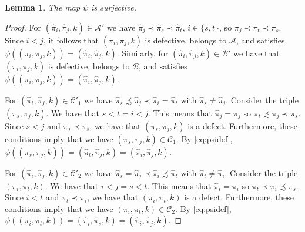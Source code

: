 \documentclass[12pt]{amsart}
\newtheorem{lem}[thm]{Lemma}
\theoremstyle{definition}
\numberwithin{equation}{section}
\newcommand{\A}{\mathcal{A}}
\newcommand{\B}{\mathcal{B}}
\newcommand{\C}{\mathcal{C}}
\newcommand{\D}{\mathcal{D}}
\begin{document}
\begin{lem}\label{l: surjective}
    The map $\psi$ is surjective.  
\end{lem}

\begin{proof}
For $(\hat\pi_i, \hat\pi_j, k) \in \A'$
we have $\hat \pi_j \prec \hat \pi_s \prec \hat \pi_t$, $i \in \{s, t\}$, so $\pi_j \prec \pi_t \prec \pi_s$. Since $i<j$, it follows that $(\pi_i, \pi_j, k)$ is defective, belongs to $\A$, and satisfies
$\psi((\pi_i, \pi_j, k)) = (\hat\pi_i, \hat\pi_j, k)$. 
Similarly, for 
$(\hat\pi_i, \hat\pi_j, k) \in \B'$
we have that
$(\pi_i, \pi_j, k)$ is defective, belongs to $\B$, and  satisfies
$\psi((\pi_i, \pi_j, k)) = (\hat\pi_i, \hat\pi_j, k)$.


For $(\hat\pi_i, \hat\pi_j, k) \in \C'_1$ we have
$\hat \pi_s \precsim \hat \pi_j \prec \hat \pi_i = \hat \pi_t$ with $\hat \pi_s \neq \hat \pi_j$.
Consider the triple $(\pi_s, \pi_j, k)$. 
We have that $s < t = i < j$. 
This means that $\hat \pi_j = \pi_j$ so $\pi_t \precsim \pi_j \prec \pi_s$. Since $s < j$ and $\pi_j \prec \pi_s$, we have that $(\pi_s, \pi_j, k)$ is a defect. Furthermore, these conditions imply that we have $(\pi_s, \pi_j, k) \in \C_1$.
By \eqref{eq:psidef}, $\psi((\pi_s, \pi_j, k)) = (\hat\pi_t, \hat\pi_j, k) = (\hat\pi_i, \hat\pi_j, k)$. 

For $(\hat\pi_i, \hat\pi_j, k) \in \C'_2$ we have
$\hat \pi_s = \hat \pi_j \prec \hat \pi_i \precsim \hat \pi_t$ with $\hat \pi_t \neq \hat \pi_i$. Consider the triple $(\pi_i, \pi_t, k)$. We have that $i < j = s < t$. This means that $\hat \pi_i = \pi_i$ so $\pi_t \prec \pi_i \precsim \pi_s$. Since $i<t$ and $\pi_t\prec \pi_i$, we have that $(\pi_i, \pi_t, k)$ is a defect. Furthermore, these conditions imply that we have $(\pi_i, \pi_t, k) \in \C_2$. By \eqref{eq:psidef}, $\psi((\pi_i, \pi_t, k)) = (\hat\pi_i, \hat\pi_s, k) = (\hat\pi_i, \hat\pi_j, k)$. 
\end{proof}
\end{document}
